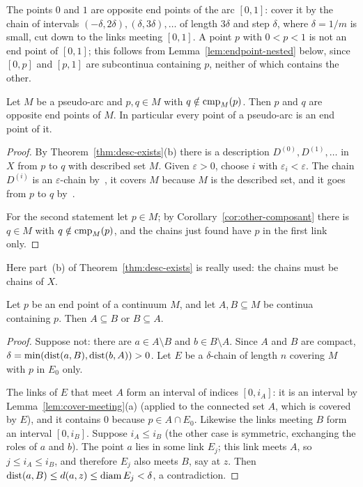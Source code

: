 
\begin{example}
The points $0$ and $1$ are opposite end points of the arc $[0,1]$: cover it by the chain of
intervals $(-\delta,2\delta),(\delta,3\delta),\dots$ of length $3\delta$ and step $\delta$, where $\delta=1/m$
is small, cut down to the links meeting $[0,1]$. A point $p$ with $0<p<1$ is not an end point of
$[0,1]$; this follows from Lemma~\ref{lem:endpoint-nested} below, since $[0,p]$ and $[p,1]$ are
subcontinua containing $p$, neither of which contains the other.
\end{example}

\begin{proposition}\label{prop:opposite}
Let $M$ be a pseudo-arc and $p,q\in M$ with $q\notin\operatorname{cmp}_{M}(p)$. Then $p$ and $q$ are opposite end
points of $M$. In particular every point of a pseudo-arc is an end point of it.
\end{proposition}

\begin{proof}
By Theorem~\ref{thm:desc-exists}(b) there is a description $D^{(0)},D^{(1)},\dots$ in $X$ from $p$
to $q$ with described set $M$. Given $\varepsilon>0$, choose $i$ with $\varepsilon_i<\varepsilon$. The
chain $D^{(i)}$ is an $\varepsilon$-chain by~, it covers $M$ because $M$ is the described
set, and it goes from $p$ to $q$ by~.

For the second statement let $p\in M$; by Corollary~\ref{cor:other-composant} there is $q\in M$
with $q\notin\operatorname{cmp}_{M}(p)$, and the chains just found have $p$ in the first link only.
\end{proof}


Here part~(b) of Theorem~\ref{thm:desc-exists} is really used: the chains must be chains of $X$.

\begin{lemma}\label{lem:endpoint-nested}
Let $p$ be an end point of a continuum $M$, and let $A,B\subseteq M$ be continua containing $p$.
Then $A\subseteq B$ or $B\subseteq A$.
\end{lemma}

\begin{proof}
Suppose not: there are $a\in A\setminus B$ and $b\in B\setminus A$. Since $A$ and $B$ are compact,
$\delta=\min(\operatorname{dist}(a,B),\operatorname{dist}(b,A))>0$. Let $E$ be a $\delta$-chain of length $n$ covering $M$ with
$p$ in $E_0$ only.

The links of $E$ that meet $A$ form an interval of indices $[0,i_A]$: it is an interval by
Lemma~\ref{lem:cover-meeting}(a) (applied to the connected set $A$, which is covered by $E$), and
it contains $0$ because $p\in A\cap E_0$. Likewise the links meeting $B$ form an interval
$[0,i_B]$. Suppose $i_A\le i_B$ (the other case is symmetric, exchanging the roles of $a$ and $b$).
The point $a$ lies in some link $E_j$; this link meets $A$, so $j\le i_A\le i_B$, and therefore $E_j$
also meets $B$, say at $z$. Then $\operatorname{dist}(a,B)\le d(a,z)\le\operatorname{diam} E_j<\delta$, a contradiction.
\end{proof}

